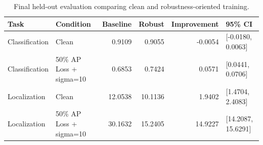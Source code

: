 \begin{table}
\caption{Final held-out evaluation comparing clean and robustness-oriented training.}
\label{tab:final_statistics}
\begin{tabular}{llrrrl}
\toprule
Task & Condition & Baseline & Robust & Improvement & 95\% CI \\
\midrule
Classification & Clean & 0.9109 & 0.9055 & -0.0054 & [-0.0180, 0.0063] \\
Classification & 50\% AP Loss + sigma=10 & 0.6853 & 0.7424 & 0.0571 & [0.0441, 0.0706] \\
Localization & Clean & 12.0538 & 10.1136 & 1.9402 & [1.4704, 2.4083] \\
Localization & 50\% AP Loss + sigma=10 & 30.1632 & 15.2405 & 14.9227 & [14.2087, 15.6291] \\
\bottomrule
\end{tabular}
\end{table}
